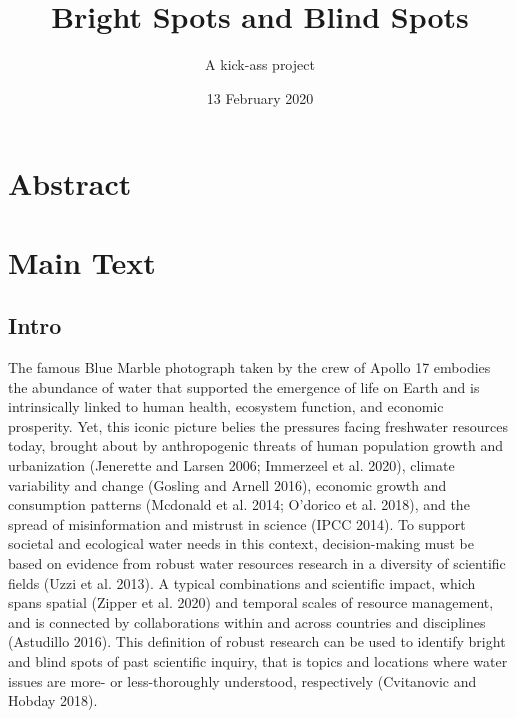 \documentclass[]{article}
\title{Bright Spots and Blind Spots}
\subtitle{A kick-ass project}
\author{}
\date{13 February 2020}
\begin{document}
\maketitle

\hypertarget{abstract}{%
\section{Abstract}\label{abstract}}

\hypertarget{main-text}{%
\section{Main Text}\label{main-text}}

\hypertarget{intro}{%
\subsection{Intro}\label{intro}}

The famous Blue Marble photograph taken by the crew of Apollo 17
embodies the abundance of water that supported the emergence of life on
Earth and is intrinsically linked to human health, ecosystem function,
and economic prosperity. Yet, this iconic picture belies the pressures
facing freshwater resources today, brought about by anthropogenic
threats of human population growth and urbanization (Jenerette and
Larsen 2006; Immerzeel et al. 2020), climate variability and change
(Gosling and Arnell 2016), economic growth and consumption patterns
(Mcdonald et al. 2014; O'dorico et al. 2018), and the spread of
misinformation and mistrust in science (IPCC 2014). To support societal
and ecological water needs in this context, decision-making must be
based on evidence from robust water resources research in a diversity of
scientific fields (Uzzi et al. 2013). A typical combinations and
scientific impact, which spans spatial (Zipper et al. 2020) and temporal
scales of resource management, and is connected by collaborations within
and across countries and disciplines (Astudillo 2016). This definition
of robust research can be used to identify bright and blind spots of
past scientific inquiry, that is topics and locations where water issues
are more- or less-thoroughly understood, respectively (Cvitanovic and
Hobday 2018).
\end{document}
